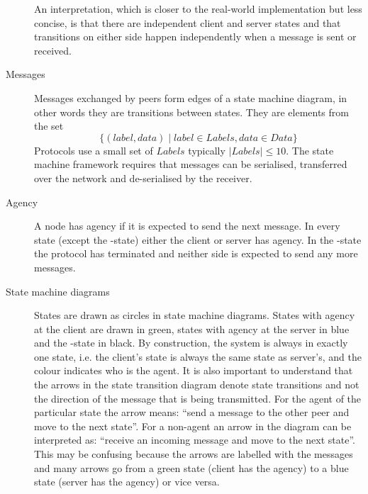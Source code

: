 \begin{description}
  An interpretation, which is closer to the real-world implementation but
  less concise, is that there are independent client and server states
  and that transitions on either side happen independently when a message is sent or received.

\item[Messages]
  Messages exchanged by peers form edges of a state machine diagram, in other
  words they are transitions between states.
  They are elements from the set
  $$\{(label, data) \mid label \in Labels, data \in Data\}$$
  Protocols use a small set of $Labels$ typically $|Labels| \leq 10$.
  The state machine framework requires that messages can be serialised,
  transferred over the network and de-serialised by the receiver.

\item[Agency]
  A node has agency if it is expected to send the next message.
  In every state (except the \StDone-state) either the client or server has agency.
  In the \StDone-state the protocol has terminated and neither side is expected to send any more
  messages.

\item [State machine diagrams]
      States are drawn as circles in state machine diagrams.
      States with agency at the client are drawn in green, states with agency at the server in blue and
      the \StDone-state in black.
      By construction, the system is always in exactly one state,
      i.e. the client's state is always the same state as server's,
      and the colour indicates who is the agent.
      It is also important to understand that the arrows in the state transition diagram denote
      state transitions and not the direction of the message that is being transmitted.
      For the agent of the particular state the arrow means: ``send a message to the
      other peer and move to the next state''.
      For a non-agent an arrow in the diagram can be interpreted as:
      ``receive an incoming message and move to the next state''.
      This may be confusing because the arrows are labelled with the messages and
      many arrows go from a green state (client has the agency) to a blue
      state (server has the agency) or vice versa.



\end{description}
